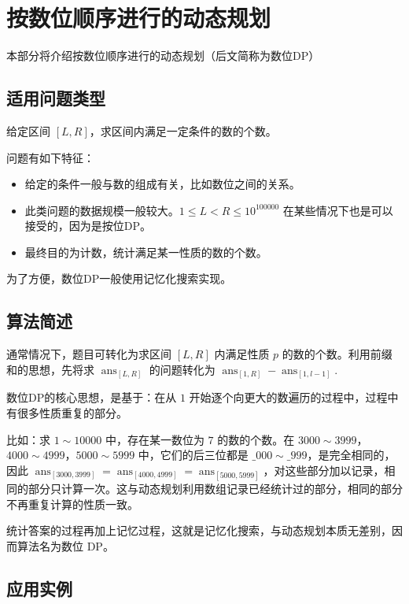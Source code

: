 
\chapter{按数位顺序进行的动态规划}

本部分将介绍按数位顺序进行的动态规划（后文简称为数位DP）

\section{适用问题类型}

给定区间 \([L,R]\)，求区间内满足一定条件的数的个数。

问题有如下特征：

\begin{itemize}
\item
  给定的条件一般与数的组成有关，比如数位之间的关系。
\item
  此类问题的数据规模一般较大。\(1\leq L<R\leq 10^{100000}\)
  在某些情况下也是可以接受的，因为是按位DP。
\item
  最终目的为计数，统计满足某一性质的数的个数。
\end{itemize}

为了方便，数位DP一般使用记忆化搜索实现。

\section{算法简述}

通常情况下，题目可转化为求区间 \([L, R]\) 内满足性质 \(p\)
的数的个数。利用前缀和的思想，先将求 \(\operatorname{ans}_{[L,R]}\)
的问题转化为
\(\operatorname{ans}_{[1,R]}-\operatorname{ans}_{[1,l-1]}\).

数位DP的核心思想，是基于：在从 \(1\)
开始逐个向更大的数遍历的过程中，过程中有很多性质重复的部分。

比如：求 \(1\sim 10000\) 中，存在某一数位为 \(7\) 的数的个数。在
\(3000\sim3999\)，\(4000\sim4999\)，\(5000\sim 5999\)
中，它们的后三位都是 \(\_000\sim \_ 999\)，是完全相同的，因此
\(\operatorname{ans}_{[3000,3999]}=\operatorname{ans}_{[4000,4999]}=\operatorname{ans}_{[5000,5999]}\)，对这些部分加以记录，相同的部分只计算一次。这与动态规划利用数组记录已经统计过的部分，相同的部分不再重复计算的性质一致。

统计答案的过程再加上记忆过程，这就是记忆化搜索，与动态规划本质无差别，因而算法名为数位
DP。

\section{应用实例}

